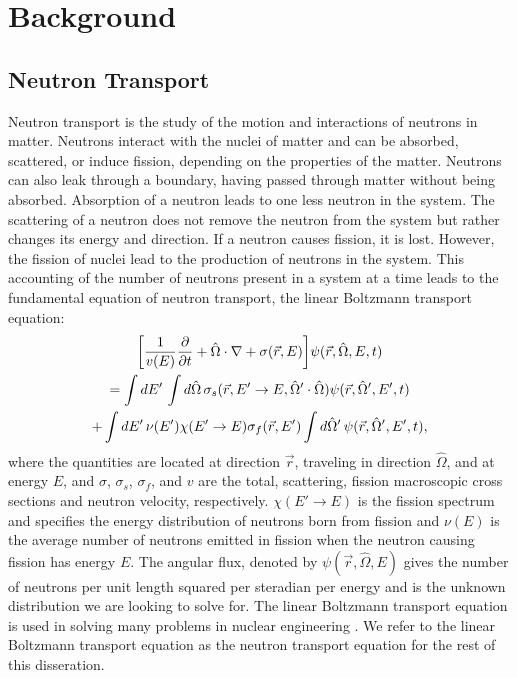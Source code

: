 \chapter{Background}

\section{Neutron Transport}

Neutron transport is the study of the motion and interactions of neutrons in matter. Neutrons interact with the nuclei of matter and can be absorbed, scattered, or induce fission, depending on the properties of the matter. Neutrons can also leak through a boundary, having passed through matter without being absorbed. Absorption of a neutron leads to one less neutron in the system. The scattering of a neutron does not remove the neutron from the system but rather changes its energy and direction. If a neutron causes fission, it is lost. However, the fission of nuclei lead to the production of neutrons in the system. This accounting of the number of neutrons present in a system at a time leads to the fundamental equation of neutron transport, the linear Boltzmann transport equation:
\begin{multline}
	\bigg [ \frac{1}{v(E)} \frac{\partial}{\partial t} + \hat{\Omega} \cdot \nabla + \sigma(\vec{r},E) \bigg ] \psi(\vec{r},\hat{\Omega},E,t) \\ = \int \mathop{}\!d E' \, \int \mathop{}\!d \hat{\Omega} \, \sigma_{s}(\vec{r},E'\rightarrow E,\hat{\Omega}' \cdot \hat{\Omega}) \psi(\vec{r},\hat{\Omega}',E',t) \\ + \int \mathop{}\!d E' \, \nu(E') \chi(E'\rightarrow E) \sigma_{f}(\vec{r},E') \int \mathop{}\!d \hat{\Omega}' \, \psi(\vec{r},\hat{\Omega}',E',t), 
	\label{eq:NeutronTransport}
\end{multline}
where the quantities are located at direction $\vec{r}$, traveling in direction $\hat{\Omega}$, and at energy $E$, and $\sigma$, $\sigma_{s}$, $\sigma_{f}$, and $v$ are the total, scattering, fission macroscopic cross sections and neutron velocity, respectively. $\chi(E'\rightarrow E)$ is the fission spectrum and specifies the energy distribution of neutrons born from fission and $\nu(E)$ is the average number of neutrons emitted in fission when the neutron causing fission has energy $E$. The angular flux, denoted by $\psi(\vec{r},\hat{\Omega},E)$ gives the number of neutrons per unit length squared per steradian per energy and is the unknown distribution we are looking to solve for. The linear Boltzmann transport equation is used in solving many problems in nuclear engineering \cite{duderstadt_nuclear_1976}. We refer to the linear Boltzmann transport equation as the neutron transport equation for the rest of this disseration.

